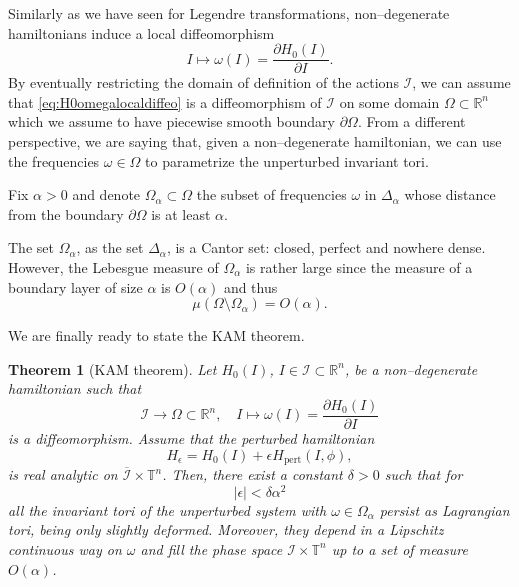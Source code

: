\documentclass[english,fontsize=11pt,paper=b5]{scrbook}
\numberwithin{equation}{chapter}
\newtheorem{theorem}{Theorem}[chapter]
\theoremstyle{definition}
\begin{document}
      Similarly as we have seen for Legendre transformations, non--degenerate hamiltonians induce a local diffeomorphism
      \begin{equation}\label{eq:H0omegalocaldiffeo}
        I \mapsto \omega(I) = \frac{\partial H_0(I)}{\partial I}.
      \end{equation}
      By eventually restricting the domain of definition of the actions $\mathcal{I}$, we can assume that \eqref{eq:H0omegalocaldiffeo} is a diffeomorphism of $\mathcal{I}$ on some domain $\Omega\subset\mathbb{R}^n$ which we assume to have piecewise smooth boundary $\partial\Omega$.
      From a different perspective, we are saying that, given a non--degenerate hamiltonian, we can use the frequencies $\omega\in\Omega$ to parametrize the unperturbed invariant tori.

      Fix $\alpha >0$ and denote $\Omega_\alpha\subset\Omega$ the subset of frequencies $\omega$ in $\Delta_\alpha$ whose distance from the boundary $\partial\Omega$ is at least $\alpha$.

      The set $\Omega_\alpha$, as the set $\Delta_\alpha$, is a Cantor set: closed, perfect and nowhere dense. However, the Lebesgue measure of $\Omega_\alpha$ is rather large since the measure of a boundary layer of size $\alpha$ is $O(\alpha)$ and thus
      \begin{equation}
        \mu(\Omega\setminus\Omega_\alpha) = O(\alpha).
      \end{equation}

      We are finally ready to state the KAM theorem.

      \begin{theorem}[KAM theorem]
        Let $H_0(I)$, $I\in\mathcal{I}\subset\mathbb{R}^n$, be a non--degenerate hamiltonian such that
        \begin{equation}
          \mathcal{I} \to \Omega\subset\mathbb{R}^n, \quad I\mapsto \omega(I) = \frac{\partial H_0(I)}{\partial I}
        \end{equation}
        is a diffeomorphism.
        Assume that the perturbed hamiltonian
        \begin{equation}
          H_{\epsilon} = H_0(I) + \epsilon H_{\mathrm{pert}}(I,\phi),
        \end{equation}
        is real analytic on $\overline{\mathcal{I}}\times\mathbb{T}^n$.
        Then, there exist a constant $\delta >0$ such that for
        \begin{equation}
          |\epsilon| < \delta\alpha^2
        \end{equation}
        all the invariant tori of the unperturbed system with $\omega\in\Omega_\alpha$ persist as Lagrangian tori, being only slightly deformed. Moreover, they depend in a Lipschitz continuous way on $\omega$ and fill the phase space $\mathcal{I}\times\mathbb{T}^n$ up to a set of measure $O(\alpha)$.
      \end{theorem}
\end{document}
